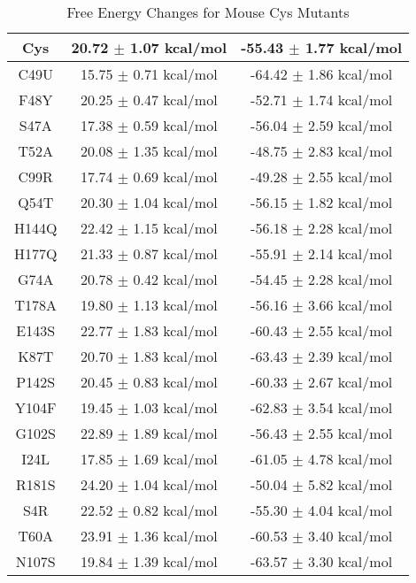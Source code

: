 \documentclass{article}
\begin{document}
\begin{table}[ht]
    \centering
    \begin{tabular}{|c|c|c|}
    \hline
    Cys & 20.72 $\pm$ 1.07 kcal/mol & -55.43 $\pm$ 1.77 kcal/mol \\
    \hline
    C49U & 15.75 $\pm$ 0.71 kcal/mol & -64.42 $\pm$ 1.86 kcal/mol \\
    \hline
    F48Y & 20.25 $\pm$ 0.47 kcal/mol & -52.71 $\pm$ 1.74 kcal/mol \\
    \hline
    S47A & 17.38 $\pm$ 0.59 kcal/mol & -56.04 $\pm$ 2.59 kcal/mol \\
    \hline
    T52A & 20.08 $\pm$ 1.35 kcal/mol & -48.75 $\pm$ 2.83 kcal/mol \\
    \hline
    C99R & 17.74 $\pm$ 0.69 kcal/mol & -49.28 $\pm$ 2.55 kcal/mol \\
    \hline
    Q54T & 20.30 $\pm$ 1.04 kcal/mol & -56.15 $\pm$ 1.82 kcal/mol \\
    \hline
    H144Q & 22.42 $\pm$ 1.15 kcal/mol & -56.18 $\pm$ 2.28 kcal/mol \\
    \hline
    H177Q & 21.33 $\pm$ 0.87 kcal/mol & -55.91 $\pm$ 2.14 kcal/mol \\
    \hline
    G74A & 20.78 $\pm$ 0.42 kcal/mol & -54.45 $\pm$ 2.28 kcal/mol \\
    \hline
    T178A & 19.80 $\pm$ 1.13 kcal/mol & -56.16 $\pm$ 3.66 kcal/mol \\
    \hline
    E143S & 22.77 $\pm$ 1.83 kcal/mol & -60.43 $\pm$ 2.55 kcal/mol \\
    \hline
    K87T & 20.70 $\pm$ 1.83 kcal/mol & -63.43 $\pm$ 2.39 kcal/mol \\
    \hline
    P142S & 20.45 $\pm$ 0.83 kcal/mol & -60.33 $\pm$ 2.67 kcal/mol \\
    \hline
    Y104F & 19.45 $\pm$ 1.03 kcal/mol & -62.83 $\pm$ 3.54 kcal/mol \\
    \hline
    G102S & 22.89 $\pm$ 1.89 kcal/mol & -56.43 $\pm$ 2.55 kcal/mol \\
    \hline
    I24L & 17.85 $\pm$ 1.69 kcal/mol & -61.05 $\pm$ 4.78 kcal/mol \\
    \hline
    R181S & 24.20 $\pm$ 1.04 kcal/mol & -50.04 $\pm$ 5.82 kcal/mol \\
    \hline
    S4R & 22.52 $\pm$ 0.82 kcal/mol & -55.30 $\pm$ 4.04 kcal/mol \\
    \hline
    T60A & 23.91 $\pm$ 1.36 kcal/mol & -60.53 $\pm$ 3.40 kcal/mol \\
    \hline
    N107S & 19.84 $\pm$ 1.39 kcal/mol & -63.57 $\pm$ 3.30 kcal/mol \\
    \hline
    \end{tabular}
    \caption{Free Energy Changes for Mouse Cys Mutants}
\end{table}
\end{document}

